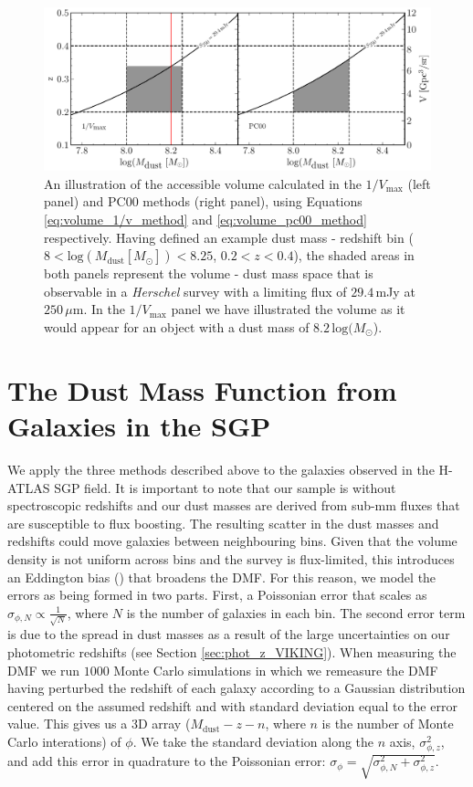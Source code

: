 \begin{figure}
	\centering
	\includegraphics[width=\columnwidth]{Figures/volume_comparison.pdf}
	\caption[Example dust mass - redshift bin for the $1/V_{\textrm{max}}$ and PC00 methods]{An illustration of the accessible volume calculated in the $1/V_{\textrm{max}}$ (left panel) and PC00 methods (right panel), using Equations \ref{eq:volume_1/v_method} and \ref{eq:volume_pc00_method} respectively. Having defined an example dust mass - redshift bin ($8 < \textrm{log}(M_{\textrm{dust}} [M_{\odot}]) < 8.25$, $0.2 < z < 0.4$), the shaded areas in both panels represent the volume - dust mass space that is observable in a \textit{Herschel} survey with a limiting flux of $29.4\,$mJy at $250\,\mu$m. In the $1/V_{\textrm{max}}$ panel we have illustrated the volume as it would appear for an object with a dust mass of $8.2\,\textrm{log}(M_{\odot}$).}
	\label{fig:volume_comparison}
\end{figure}

\section{The Dust Mass Function from Galaxies in the SGP}
\label{sec:dmf_from_sgp}

We apply the three methods described above to the galaxies observed in the H-ATLAS SGP field. It is important to note that our sample is without spectroscopic redshifts and our dust masses are derived from sub-mm fluxes that are susceptible to flux boosting. The resulting scatter in the dust masses and redshifts could move galaxies between neighbouring bins. Given that the volume density is not uniform across bins and the survey is flux-limited, this introduces an Eddington bias (\citealt{Eddington_1913}) that broadens the DMF. For this reason, we model the errors as being formed in two parts. First, a Poissonian error that scales as $\sigma_{\phi,N} \propto \frac{1}{\sqrt{N}}$, where $N$ is the number of galaxies in each bin. The second error term is due to the spread in dust masses as a result of the large uncertainties on our photometric redshifts (see Section \ref{sec:phot_z_VIKING}). When measuring the DMF we run $1000$ Monte Carlo simulations in which we remeasure the DMF having perturbed the redshift of each galaxy according to a Gaussian distribution centered on the assumed redshift and with standard deviation equal to the error value. This gives us a 3D array ($M_{\textrm{dust}} - z - n$, where $n$ is the number of Monte Carlo interations) of $\phi$. We take the standard deviation along the $n$ axis, $\sigma_{\phi,z}^2$, and add this error in quadrature to the Poissonian error: $\sigma_\phi = \sqrt{\sigma_{\phi,N}^2 + \sigma_{\phi,z}^2}$.

